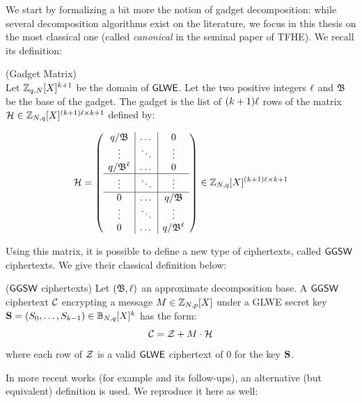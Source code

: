 We start by formalizing a bit more the notion of gadget decomposition: while several decomposition algorithms exist on the literature, we focus in this thesis on the most classical one (called \textit{canonical} in the seminal paper of TFHE). We recall its definition:

	
\begin{definition}(Gadget Matrix)\\
	Let $\mathbb{Z}_{q, N}[X]^{k+1}$ be the domain of $\textsf{GLWE}$. Let the two positive integers $\ell$ and $\mathfrak{B}$ be the base of the gadget. The gadget is the list of $(k+1) \ell$ rows of the matrix $\mathcal H \in \mathbb{Z}_{N, q}[X]^{(k+1)\ell \times k+1}$ defined by:
	
	\[
	\mathcal H = 
	\left(
	\begin{array}{c|c|c}
		q / \mathfrak{B} & \dots & 0 \\
		\vdots & \ddots & \vdots  \\
		q / \mathfrak{B}^{\ell} & \dots & 0 \\
		\hline
		\vdots & \ddots & \vdots \\
		\hline
		0 & \dots & q / \mathfrak{B} \\
		\vdots & \ddots & \vdots  \\
		0 & \dots & q / \mathfrak{B}^{\ell}\\
	\end{array}
	\right) \in \mathbb{Z}_{N, q}[X]^{(k+1)\ell \times k+1}
	\]
\end{definition}
	


Using this matrix, it is possible to define a new type of ciphertexts, called $\textsf{GGSW}$ ciphertexts. We give their classical definition below:


\begin{definition}($\textsf{GGSW}$ ciphertexts)
	Let $(\mathfrak{B}, \ell)$ an approximate decomposition base. A $\textsf{GGSW}$ ciphertext $\mathcal C$ encrypting a message $M \in \mathbb{Z}_{N,p}[X]$ under a GLWE secret key $\mathbf S =  (S_0, \dots, S_{k-1}) \in \mathbb{B}_{N, q}[X]^k$ has the form:
	\begin{equation*}
		\mathcal C = \mathcal Z + M \cdot \mathcal H
	\end{equation*}
	where each row of $\mathcal Z$ is a valid $\textsf{GLWE}$ ciphertext of 0 for the key $\mathbf S$. 
	
\end{definition}


In more recent works (for example \cite{AC:CLOT21} and its follow-ups), an alternative (but equivalent) definition is used. We reproduce it here as well:

